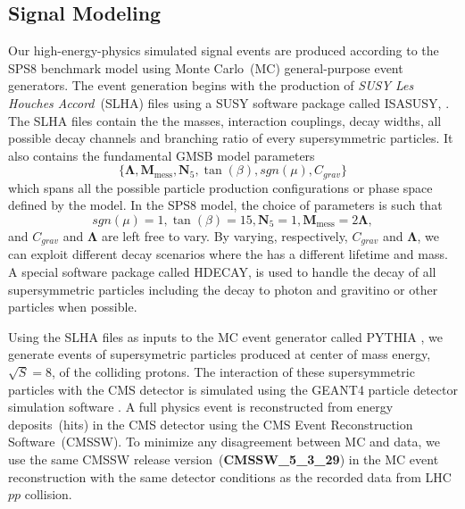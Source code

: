 \subsection{Signal Modeling}
Our high-energy-physics simulated signal events are produced according to the SPS8 benchmark model using Monte Carlo~(MC) general-purpose event generators. The event generation begins with the production of \textit{SUSY Les Houches Accord}~(SLHA) files using a SUSY software package called \textsf{ISASUSY}, \cite{ISAJET}. The SLHA files contain the the masses, interaction couplings, decay widths, all possible decay channels and branching ratio of every supersymmetric particles. It also contains the fundamental GMSB model parameters
\begin{equation}\label{eq:SUSYPARMS}
\Big\{ \mathbf{\Lambda}, \mathbf{M}_{\mbox{mess}}, \mathbf{N}_{5}, \tan(\beta), sgn(\mu), C_{grav}\Big\} 
\end{equation}
which spans all the possible particle production configurations or phase space defined by the model. In the SPS8 model, the choice of parameters is such that
\begin{equation}\label{eq:SPS8PARM}
sgn(\mu)= 1, \tan(\beta) = 15, \mathbf{N}_{5} = 1, \mathbf{M}_{\mbox{mess}} = 2\mathbf{\Lambda},
\end{equation}
and $C_{grav}$ and $\mathbf{\Lambda} $ are left free to vary. By varying, respectively, $C_{grav}$ and $\mathbf{\Lambda}$, we can exploit different decay scenarios where the \PSneutralinoOne has a different lifetime and mass. A special software package called \textsf{HDECAY}, is used to handle the decay of all supersymmetric particles including the \PSneutralinoOne decay to photon and gravitino or other particles when possible.
\par
Using the SLHA files as inputs to the MC event generator called \textsf{PYTHIA} \cite{PYTHIA6}, we generate events of supersymetric particles produced at center of mass energy, $\sqrt{S} = 8$\TeV, of the colliding protons. The interaction of these supersymmetric particles with the CMS detector is simulated using the GEANT4 particle detector simulation software \cite{GEANT4}. A full physics event is reconstructed from energy deposits~(hits) in the CMS detector using the CMS Event Reconstruction Software~(CMSSW). To minimize any disagreement between MC and data, we use the same CMSSW release version~(\textbf{CMSSW\_5\_3\_29}) in the MC event reconstruction with the same detector conditions as the recorded data from LHC $pp$ collision.
\par 
